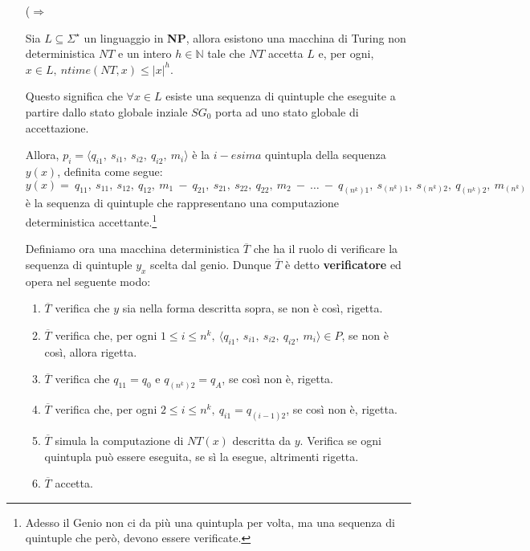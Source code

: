 \begin{itemize}
    \item [($\Rightarrow$]{
        Sia $L \subseteq \Sigma^{\star}$ un linguaggio in \textbf{NP}, allora esistono una macchina di Turing non 
        deterministica $NT$ e un intero $h \in \mathbb{N}$ tale che $NT$ accetta $L$ e, per ogni, $x \in L,\ ntime(NT, x) \leq |x|^h$.
        
        Questo significa che $\forall x \in L$ esiste una sequenza di quintuple che eseguite a partire dallo stato globale inziale $SG_{0}$ 
        porta ad uno stato globale di accettazione. 

        Allora, $p_{i} = \langle q_{i1},\ s_{i1},\ s_{i2},\ q_{i2},\ m_{i} \rangle$ è la $i-esima$ quintupla 
        della sequenza $y(x)$, definita come segue:
        $$y(x) =\ q_{11},\ s_{11},\ s_{12},\ q_{12},\ m_{1}\ -\ q_{21},\ s_{21},\ s_{22},\ q_{22},\ m_{2}\ -\ \dots\ -\ q_{(n^{k})1},\ s_{(n^{k})1},\ s_{(n^{k})2},\ q_{(n^{k})2},\ m_{(n^{k})}$$
        è la sequenza di quintuple che rappresentano una computazione deterministica accettante.\footnote{Adesso il Genio non ci da più una quintupla per volta, ma una sequenza di quintuple che però, devono essere verificate.}

        Definiamo ora una macchina deterministica $\overline{T}$ che ha il ruolo di verificare la sequenza di quintuple $y_{x}$ scelta dal genio. Dunque $\overline{T}$ è 
        detto \textbf{verificatore} ed opera nel seguente modo:
        \begin{enumerate}
            \item $\overline{T}$ verifica che $y$ sia nella forma descritta sopra, se non è così, rigetta.
            \item $\overline{T}$ verifica che, per ogni $1 \leq i \leq n^k,\ \langle q_{i1},\ s_{i1},\ s_{i2},\ q_{i2},\ m_{i} \rangle \in P$, se non è così, allora rigetta.
            \item $\overline{T}$ verifica che $q_{11} = q_{0}$ e $q_{(n^k)2} = q_{A}$, se così non è, rigetta.
            \item $\overline{T}$ verifica che, per ogni $2 \leq i \leq n^k,\ q_{i1} = q_{(i - 1)2}$, se così non è, rigetta.
            \item $\overline{T}$ simula la computazione di $NT(x)$ descritta da $y$. Verifica se ogni quintupla può essere eseguita, se sì la esegue, altrimenti rigetta.
            \item $\overline{T}$ accetta.
        \end{enumerate}

}
\end{itemize}

